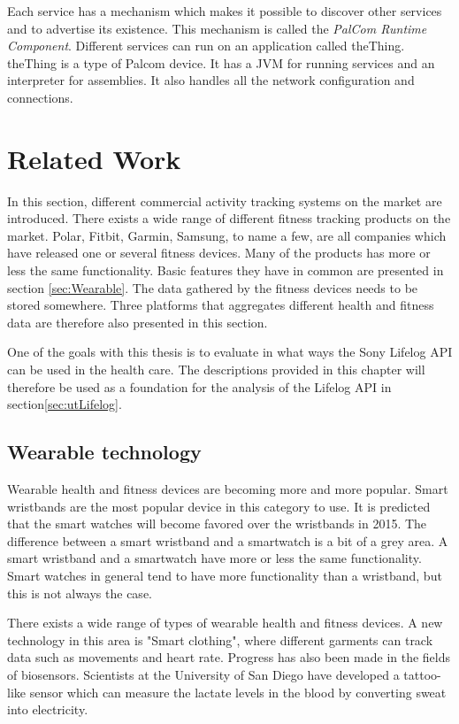 \documentclass{cslthse-msc}
\begin{document}
Each service has a mechanism which makes it possible to discover other services and to advertise its existence. This mechanism is called the \emph{PalCom Runtime Component}. Different services can run on an application called theThing. theThing is a type of Palcom device. It has a JVM for running services and an interpreter for assemblies. It also handles all the network configuration and connections.



\chapter[Related Work]{Related Work}


In this section, different commercial activity tracking systems on the market are introduced. There exists a wide range of different fitness tracking products on the market. Polar, Fitbit, Garmin, Samsung, to name a few, are all companies which have released one or several fitness devices. Many of the products has more or less the same functionality. Basic features they have in common are presented in section \ref{sec:Wearable}. The data gathered by the fitness devices needs to be stored somewhere. Three platforms that aggregates different health and fitness data are therefore also presented in this section.

One of the goals with this thesis is to evaluate in what ways the Sony Lifelog API can be used in the health care. The descriptions provided in this chapter will therefore be used as a foundation for the analysis of the Lifelog API in section\ref{sec:utLifelog}.

\section{Wearable technology}
Wearable health and fitness devices are becoming more and more popular. Smart wristbands are the most popular device in this category to use. It is predicted that the smart watches will become favored over the wristbands in 2015\cite{gartner}. The difference between a smart wristband and a smartwatch is a bit of a grey area. A smart wristband and a smartwatch have more or less the same functionality. Smart watches in general tend to have more functionality than a wristband, but this is not always the case. 

There exists a wide range of types of wearable health and fitness devices. A new technology in this area is "Smart clothing", where different garments can track data such as movements and heart rate\cite{callaway2015quantified}. Progress has also been made in the fields of biosensors. Scientists at the University of San Diego have developed a tattoo-like sensor which can measure the lactate levels in the blood by converting sweat into electricity\cite{tattoo-device}.
\end{document}
